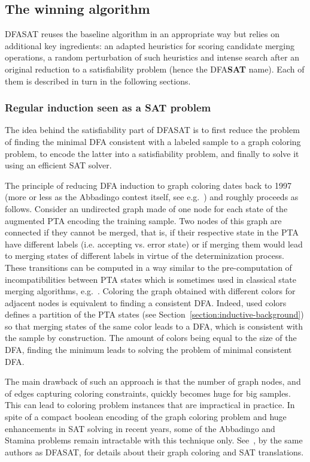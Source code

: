 \subsection{The winning algorithm\label{subsection:stamina-winning}}

DFASAT reuses the baseline algorithm in an appropriate way but relies on additional key ingredients: an adapted heuristics for scoring candidate merging operations, a random perturbation of such heuristics and intense search after an original reduction to a satisfiability problem (hence the DFA\textbf{SAT} name). Each of them is described in turn in the following sections.

\subsubsection*{Regular induction seen as a SAT problem}

The idea behind the satisfiability part of DFASAT is to first reduce the problem of finding the minimal DFA consistent with a labeled sample to a graph coloring problem, to encode the latter into a satisfiability problem, and finally to solve it using an efficient SAT solver. 

The principle of reducing DFA induction to graph coloring dates back to 1997 (more or less as the Abbadingo contest itself, see e.g.~\cite{Coste:1997}) and roughly proceeds as follows. Consider an undirected graph made of one node for each state of the augmented PTA encoding the training sample. Two nodes of this graph are connected if they cannot be merged, that is, if their respective state in the PTA have different labels (i.e. accepting vs. error state) or if merging them would lead to merging states of different labels in virtue of the determinization process. These transitions can be computed in a way similar to the pre-computation of incompatibilities between PTA states which is sometimes used in classical state merging algorithms, e.g.~\cite{Coste:1998, Coste:2004}. Coloring the graph obtained with different colors for adjacent nodes is equivalent to finding a consistent DFA. Indeed, used colors defines a partition of the PTA states (see Section~\ref{section:inductive-background}) so that merging states of the same color leads to a DFA, which is consistent with the sample by construction. The amount of colors being equal to the size of the DFA, finding the minimum leads to solving the problem of minimal consistent DFA.

The main drawback of such an approach is that the number of graph nodes, and of edges capturing coloring constraints, quickly becomes huge for big samples. This can lead to coloring problem instances that are impractical in practice. In spite of a compact boolean encoding of the graph coloring problem and huge enhancements in SAT solving in recent years, some of the Abbadingo and Stamina problems remain intractable with this technique only. See~\cite{Heule:2010}, by the same authors as DFASAT, for details about their graph coloring and SAT translations.


